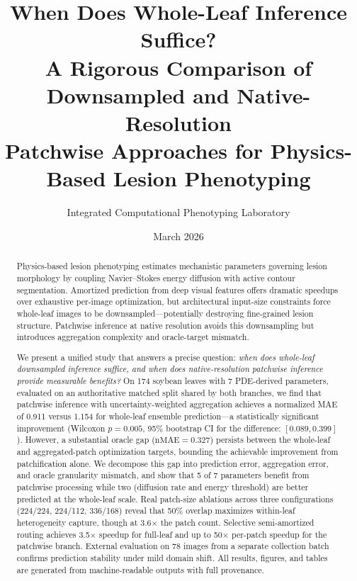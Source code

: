 \documentclass[11pt,a4paper]{article}
\title{When Does Whole-Leaf Inference Suffice? \\
A Rigorous Comparison of Downsampled and Native-Resolution \\
Patchwise Approaches for Physics-Based Lesion Phenotyping}
\author{Integrated Computational Phenotyping Laboratory}
\date{March 2026}
\newcommand{\nMAE}{\mathrm{nMAE}}
\begin{document}
\maketitle

\begin{abstract}
Physics-based lesion phenotyping estimates mechanistic parameters governing lesion morphology by coupling Navier--Stokes energy diffusion with active contour segmentation.
Amortized prediction from deep visual features offers dramatic speedups over exhaustive per-image optimization, but architectural input-size constraints force whole-leaf images to be downsampled---potentially destroying fine-grained lesion structure.
Patchwise inference at native resolution avoids this downsampling but introduces aggregation complexity and oracle-target mismatch.

We present a unified study that answers a precise question:
\emph{when does whole-leaf downsampled inference suffice, and when does native-resolution patchwise inference provide measurable benefits?}
On 174 soybean leaves with 7 PDE-derived parameters, evaluated on an authoritative matched split shared by both branches, we find that patchwise inference with uncertainty-weighted aggregation achieves a normalized MAE of 0.911 versus 1.154 for whole-leaf ensemble prediction---a statistically significant improvement (Wilcoxon $p = 0.005$, 95\% bootstrap CI for the difference: $[0.089, 0.399]$).
However, a substantial oracle gap ($\nMAE = 0.327$) persists between the whole-leaf and aggregated-patch optimization targets, bounding the achievable improvement from patchification alone.
We decompose this gap into prediction error, aggregation error, and oracle granularity mismatch, and show that 5 of 7 parameters benefit from patchwise processing while two (diffusion rate and energy threshold) are better predicted at the whole-leaf scale.
Real patch-size ablations across three configurations (224/224, 224/112, 336/168) reveal that 50\% overlap maximizes within-leaf heterogeneity capture, though at 3.6$\times$ the patch count.
Selective semi-amortized routing achieves 3.5$\times$ speedup for full-leaf and up to 50$\times$ per-patch speedup for the patchwise branch.
External evaluation on 78 images from a separate collection batch confirms prediction stability under mild domain shift.
All results, figures, and tables are generated from machine-readable outputs with full provenance.
\end{abstract}
\end{document}
